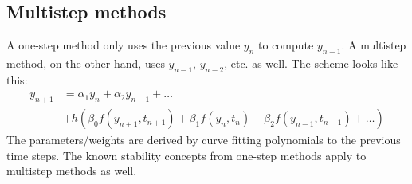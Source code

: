 \subsection{Multistep methods}
A one-step method only uses the previous value $y_n$ to compute $y_{n+1}$. A multistep method, on the other hand, uses $y_{n-1}$, $y_{n-2}$, etc. as well. The scheme looks like this:
\begin{equation}
    \begin{split}
    y_{n+1} &= \alpha_1 y_n + \alpha_2 y_{n-1} + \dots \\ &+ h(\beta_0 f(y_{n+1}, t_{n+1}) + \beta_1 f(y_n, t_n) + \beta_2 f(y_{n-1}, t_{n-1}) + \dots)
    \end{split}
\end{equation}
The parameters/weights are derived by curve fitting polynomials to the previous time steps.
The known stability concepts from one-step methods apply to multistep methods as well.